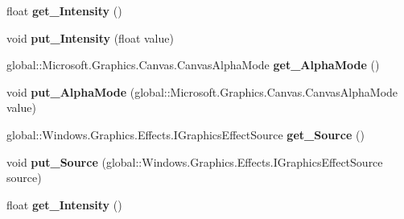 \begin{DoxyCompactItemize}
\mbox{\label{interface_microsoft_1_1_graphics_1_1_canvas_1_1_effects_1_1_i_sepia_effect_aee3d7d45c759c48558e8ac58694d0f0f}} 
float {\bfseries get\+\_\+\+Intensity} ()
\item 
\mbox{\label{interface_microsoft_1_1_graphics_1_1_canvas_1_1_effects_1_1_i_sepia_effect_a9682e9765a9acc23c0ba196c33ca8367}} 
void {\bfseries put\+\_\+\+Intensity} (float value)
\item 
\mbox{\label{interface_microsoft_1_1_graphics_1_1_canvas_1_1_effects_1_1_i_sepia_effect_af0e3b772c6a8f51c2b8bc71a3c7e2e09}} 
global\+::\+Microsoft.\+Graphics.\+Canvas.\+Canvas\+Alpha\+Mode {\bfseries get\+\_\+\+Alpha\+Mode} ()
\item 
\mbox{\label{interface_microsoft_1_1_graphics_1_1_canvas_1_1_effects_1_1_i_sepia_effect_a28750df56d32d0e2653893f6de5805d7}} 
void {\bfseries put\+\_\+\+Alpha\+Mode} (global\+::\+Microsoft.\+Graphics.\+Canvas.\+Canvas\+Alpha\+Mode value)
\item 
\mbox{\label{interface_microsoft_1_1_graphics_1_1_canvas_1_1_effects_1_1_i_sepia_effect_ac7c0465ec6fc4284a0f0205b572f78a8}} 
global\+::\+Windows.\+Graphics.\+Effects.\+I\+Graphics\+Effect\+Source {\bfseries get\+\_\+\+Source} ()
\item 
\mbox{\label{interface_microsoft_1_1_graphics_1_1_canvas_1_1_effects_1_1_i_sepia_effect_a1673f79e0f93155b9778ad30b74eb86b}} 
void {\bfseries put\+\_\+\+Source} (global\+::\+Windows.\+Graphics.\+Effects.\+I\+Graphics\+Effect\+Source source)
\item 
\mbox{\label{interface_microsoft_1_1_graphics_1_1_canvas_1_1_effects_1_1_i_sepia_effect_aee3d7d45c759c48558e8ac58694d0f0f}} 
float {\bfseries get\+\_\+\+Intensity} ()
\item 

\end{DoxyCompactItemize}
